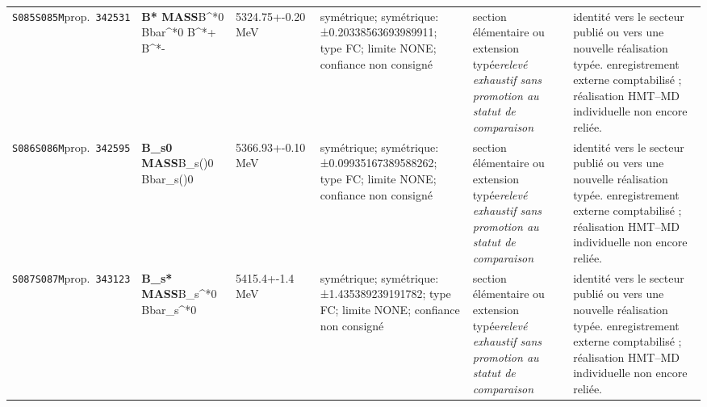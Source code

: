 \begin{landscape}
\begin{longtable}{L{1.85cm}L{4.45cm}L{2.35cm}L{4.05cm}L{3.35cm}L{7.15cm}}
\texttt{S085}\newline \texttt{S085M}\newline prop.\ \texttt{342531} & \textbf{B* MASS}\newline B\textasciicircum{}*0 \textbar{}\allowbreak{} Bbar\textasciicircum{}*0 \textbar{}\allowbreak{} B\textasciicircum{}*+ \textbar{}\allowbreak{} B\textasciicircum{}*- & 5324.75+-0.20\,MeV & symétrique; symétrique: ±0.20338563693989911; type FC; limite NONE; confiance non consigné & section élémentaire ou extension typée\newline \emph{relevé exhaustif sans promotion au statut de comparaison} & identité vers le secteur publié ou vers une nouvelle réalisation typée. enregistrement externe comptabilisé ; réalisation HMT--MD individuelle non encore reliée. \\
\texttt{S086}\newline \texttt{S086M}\newline prop.\ \texttt{342595} & \textbf{B\_\allowbreak{}s0 MASS}\newline B\_\allowbreak{}s()0 \textbar{}\allowbreak{} Bbar\_\allowbreak{}s()0 & 5366.93+-0.10\,MeV & symétrique; symétrique: ±0.09935167389588262; type FC; limite NONE; confiance non consigné & section élémentaire ou extension typée\newline \emph{relevé exhaustif sans promotion au statut de comparaison} & identité vers le secteur publié ou vers une nouvelle réalisation typée. enregistrement externe comptabilisé ; réalisation HMT--MD individuelle non encore reliée. \\
\texttt{S087}\newline \texttt{S087M}\newline prop.\ \texttt{343123} & \textbf{B\_\allowbreak{}s* MASS}\newline B\_\allowbreak{}s\textasciicircum{}*0 \textbar{}\allowbreak{} Bbar\_\allowbreak{}s\textasciicircum{}*0 & 5415.4+-1.4\,MeV & symétrique; symétrique: ±1.435389239191782; type FC; limite NONE; confiance non consigné & section élémentaire ou extension typée\newline \emph{relevé exhaustif sans promotion au statut de comparaison} & identité vers le secteur publié ou vers une nouvelle réalisation typée. enregistrement externe comptabilisé ; réalisation HMT--MD individuelle non encore reliée. \\

\end{longtable}
\end{landscape}
